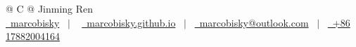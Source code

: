 \documentclass[a4paper,11pt]{article}
\begin{document}
\pagestyle{empty} 


\begin{tabularx}{\linewidth}{@{} C @{}}
\Huge{Jinming Ren} \\[7.5pt]
\href{https://github.com/marcobisky}{\raisebox{-0.05\height}\faGithub\ marcobisky} \ $|$ \ 
\href{https://marcobisky.github.io}{\raisebox{-0.05\height}\faGlobe \ marcobisky.github.io} \ $|$ \ 
\href{mailto:marcobisky@outlook.com}{\raisebox{-0.05\height}\faEnvelope \ marcobisky@outlook.com} \ $|$ \ 
\href{tel:+86 17882004164}{\raisebox{-0.05\height}\faMobile \ +86 17882004164} \\
\end{tabularx}





\vfill
{}
\end{document}
